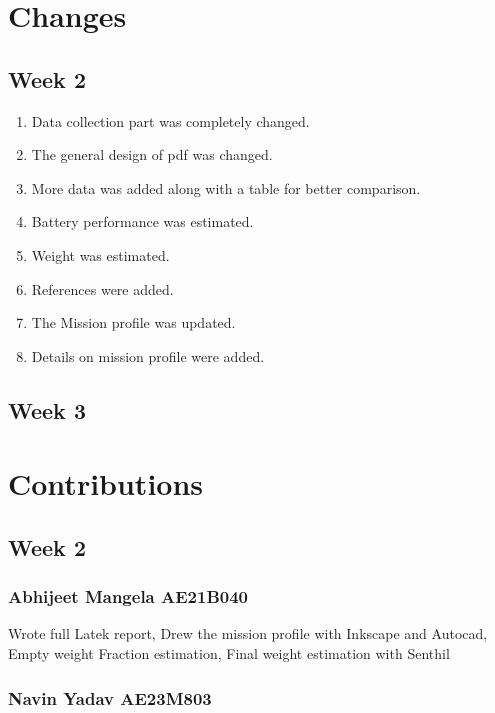 \documentclass[12 pt]{article}
\begin{document}



\newpage

\section{Changes}

\subsection{Week 2}
\begin{enumerate}
    \item Data collection part was completely changed.
    \item The general design of pdf was changed.
    \item More data was added along with a table for better comparison.
    \item Battery performance was estimated.
    \item Weight was estimated.
    \item References were added.
    \item The Mission profile was updated.
    \item Details on mission profile were added.
\end{enumerate}

\subsection{Week 3}

\newpage

\section{Contributions}

\subsection{Week 2}

\subsubsection{Abhijeet Mangela AE21B040}
Wrote full Latek report, Drew the mission profile with Inkscape and Autocad, Empty weight Fraction estimation, Final weight estimation with Senthil

\subsubsection{Navin Yadav AE23M803}
\end{document}
